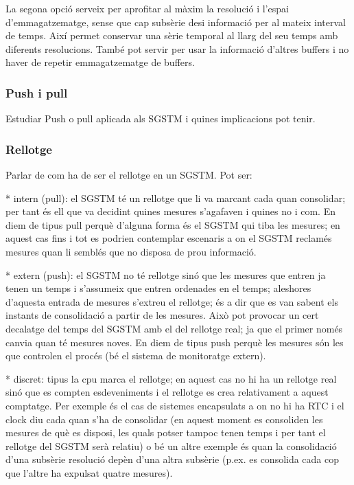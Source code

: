 La segona opció serveix per aprofitar al màxim la resolució i l'espai d'emmagatzematge, sense que cap subsèrie desi informació per al mateix interval de temps. Així permet conservar una sèrie temporal al llarg del seu temps amb diferents resolucions. També pot servir per usar la informació d'altres buffers i no haver de repetir emmagatzematge de buffers.









\subsubsection{Push i pull}

Estudiar Push o pull aplicada als SGSTM i quines implicacions pot tenir.


\subsubsection{Rellotge}

Parlar de com ha de ser el rellotge en un SGSTM. Pot ser:

* intern (pull): el SGSTM té un rellotge que li va marcant cada quan consolidar; per tant és ell que va decidint quines mesures s'agafaven i quines no i com. En diem de tipus pull perquè d'alguna forma és el SGSTM qui tiba les mesures; en aquest cas fins i tot es podrien contemplar escenaris a on el SGSTM reclamés mesures quan li semblés que no disposa de prou informació.

* extern (push): el SGSTM no té rellotge sinó que les mesures que entren ja tenen un temps i s'assumeix que entren ordenades en el temps; aleshores d'aquesta entrada de mesures s'extreu el rellotge; és a dir que es van sabent els instants de consolidació a partir de les mesures. Això pot provocar un cert decalatge del temps del SGSTM amb el del rellotge real; ja que el primer només canvia quan té mesures noves. En diem de tipus push perquè les mesures són les que controlen el procés (bé el sistema de monitoratge extern). 

* discret: tipus la cpu marca el rellotge; en aquest cas no hi ha un rellotge real sinó que es compten esdeveniments i el rellotge es crea relativament a aquest comptatge. Per exemple és el cas de sistemes encapsulats a on no hi ha RTC i el clock diu cada quan s'ha de consolidar (en aquest moment es consoliden les mesures de què es disposi, les quals potser tampoc tenen temps i per tant el rellotge del SGSTM serà relatiu) o bé un altre exemple és quan la consolidació d'una subsèrie resolució depèn d'una altra subsèrie (p.ex. es consolida cada cop que l'altre ha expulsat quatre mesures).




